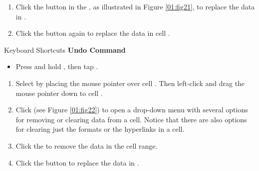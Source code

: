 \begin{enumbox}
	\begin{enumerate}
		\item Click the  button in the , as illustrated in Figure \ref{01:fig21}, to replace the data in .
		\item Click the  button again to replace the data in cell .
	\end{enumerate}
\end{enumbox}

\begin{center}
	\begin{shtcutbox}{Keyboard Shortcuts}
		\textbf{Undo Command}
		\\
		\begin{itemize}
			\setlength{\itemsep}{0pt}
			\setlength{\parskip}{0pt}
			\setlength{\parsep}{0pt}
			
			\item Press and hold , then tap .
			
		\end{itemize}
	\end{shtcutbox}
\end{center}

\begin{enumbox}
	\begin{enumerate}
		\item Select  by placing the mouse pointer over cell . Then left-click and drag the mouse pointer down to cell .
		\item Click  (see Figure \ref{01:fig22}) to open a drop-down menu with several options for removing or clearing data from a cell. Notice that there are also options for clearing just the formats or the hyperlinks in a cell.
		\item Click the  to remove the data in the cell range.
		\item Click the  button to replace the data in .
	\end{enumerate}
\end{enumbox}


